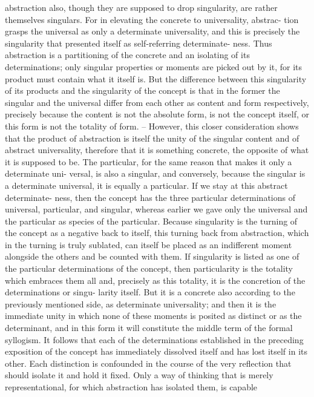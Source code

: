 abstraction also, though they are supposed to drop singularity, are rather
themselves singulars. For in elevating the concrete to universality, abstrac-
tion grasps the universal as only a determinate universality, and this is
precisely the singularity that presented itself as self-referring determinate-
ness. Thus abstraction is a partitioning of the concrete and an isolating of its
determinations; only singular properties or moments are picked out by it,
for its product must contain what it itself is. But the difference between this
singularity of its products and the singularity of the concept is that in the
former the singular and the universal differ from each other as content and
form respectively, precisely because the content is not the absolute form, is
not the concept itself, or this form is not the totality of form. – However,
this closer consideration shows that the product of abstraction is itself the
unity of the singular content and of abstract universality, therefore that it
is something concrete, the opposite of what it is supposed to be.
The particular, for the same reason that makes it only a determinate uni-
versal, is also a singular, and conversely, because the singular is a determinate
universal, it is equally a particular. If we stay at this abstract determinate-
ness, then the concept has the three particular determinations of universal,
particular, and singular, whereas earlier we gave only the universal and the
particular as species of the particular. Because singularity is the turning of
the concept as a negative back to itself, this turning back from abstraction,
which in the turning is truly sublated, can itself be placed as an indifferent
moment alongside the others and be counted with them.
If singularity is listed as one of the particular determinations of the
concept, then particularity is the totality which embraces them all and,
precisely as this totality, it is the concretion of the determinations or singu-
larity itself. But it is a concrete also according to the previously mentioned
side, as determinate universality; and then it is the immediate unity in
which none of these moments is posited as distinct or as the determinant,
and in this form it will constitute the middle term of the formal syllogism.
It follows that each of the determinations established in the preceding
exposition of the concept has immediately dissolved itself and has lost
itself in its other. Each distinction is confounded in the course of the very
reflection that should isolate it and hold it fixed. Only a way of thinking that
is merely representational, for which abstraction has isolated them, is capable
